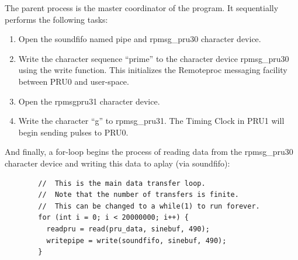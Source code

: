 	The parent process is the master coordinator of the program.  It sequentially performs the following tasks:
	
	\begin{enumerate}
	\item Open the soundfifo named pipe and rpmsg\_pru30 character device.
	\item Write the character sequence ``prime'' to the character device rpmsg\_pru30 using the write function.  This initializes the Remoteproc messaging facility between PRU0 and user-space.
	\item Open the rpmsg\-pru31 character device.
	\item Write the character ``g'' to rpmsg\_pru31.  The Timing Clock in PRU1 will begin sending pulses to PRU0.
	\end{enumerate}
	
	And finally, a for-loop begins the process of reading data from the rpmsg\_pru30 character device and writing this data to aplay (via soundfifo):
	
	\begin{verbatim}
	    //  This is the main data transfer loop.
	    //  Note that the number of transfers is finite.
	    //  This can be changed to a while(1) to run forever.
	    for (int i = 0; i < 20000000; i++) {
	      readpru = read(pru_data, sinebuf, 490);
	      writepipe = write(soundfifo, sinebuf, 490);
	    }
	\end{verbatim}